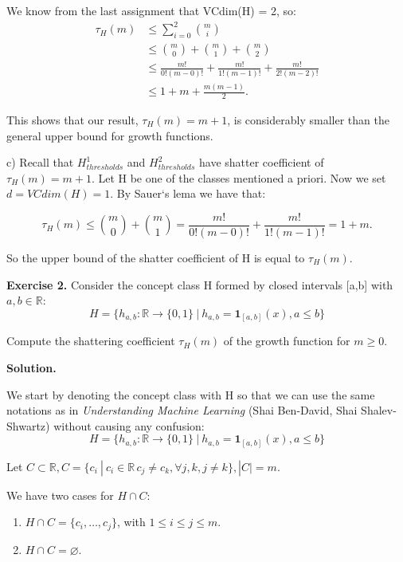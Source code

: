 \documentclass{article}
\newcommand{\<}{\langle}
\renewcommand{\>}{\rangle}
\theoremstyle{definition}
\begin{document}
We know from the last assignment that VCdim(H) = 2, so:
\[
\begin{aligned}
    \tau_H(m) & \leq \sum_{i=0}^{2} {m \choose i}\\
    & \leq {m \choose 0} + {m \choose 1} + {m \choose 2}\\
    & \leq \frac{m!}{0!(m-0)!} + \frac{m!}{1!(m-1)!} + \frac{m!}{2!(m-2)!} \\
    & \leq 1 + m + \frac{m(m-1)}{2}.
\end{aligned}
\]

This shows that our result, $\tau_H(m) = m + 1$, is considerably smaller than the general upper bound for growth functions.

c) Recall that $H_{thresholds}^{1}$ and $H_{thresholds}^{2}$ have shatter coefficient of $\tau_H(m) = m + 1$. Let H be one of the classes mentioned a priori. Now we set $d = VCdim(H) = 1$. By Sauer`s lema we have that:

$$\tau_H(m) \leq {m \choose 0} + {m \choose 1} = \frac{m!}{0!(m-0)!} + \frac{m!}{1!(m-1)!} = 1 + m.$$ 

So the upper bound of the shatter coefficient of H is equal to $\tau_H(m)$.

\vspace{3mm}

\textbf{Exercise 2.} Consider the concept class H formed by closed intervals [a,b] with $a,b \in \mathbb{R}$:
\vspace{-1mm}
$$H = \{h_{a,b} : \mathbb{R} \rightarrow \{0, 1\} \ | \ h_{a,b} = \textbf{1}_{[a,b]}(x), a \leq b\}$$

Compute the shattering coefficient $\tau_H(m)$ of the growth function for $m \geq 0$.

\textbf{Solution.}

We start by denoting the concept class with H so that we can use the same notations as in \textit{Understanding Machine Learning} (Shai Ben-David, Shai Shalev-Shwartz) without causing any confusion: 
\vspace{-1mm}
$$H = \{h_{a,b} : \mathbb{R} \rightarrow \{0, 1\} \ | \ h_{a,b} = \textbf{1}_{[a,b]}(x), a \leq b\}$$

Let $C \subset \mathbb{R}, C = \{c_i \ | \ c_i \in \mathbb{R} \, c_j \neq c_k, \forall j,k, j \neq k\},|C| = m$.

We have two cases for $H \cap C$:

\begin{enumerate}
    \item $H \cap C = \{c_i, \dots , c_j\}$, with $1 \leq i \leq j \leq m$. 
    \item $H \cap C = \varnothing$. 
\end{enumerate}
\end{document}
